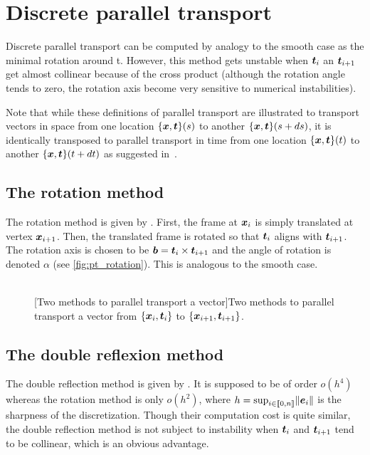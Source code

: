 \section{Discrete parallel transport}\label{sec:discrete_pt}

Discrete parallel transport can be computed by analogy to the smooth case as the minimal rotation around t. However, this method gets unstable when $\boldsymbol{t}_i$ an $\boldsymbol{t}_{i+1}$ get almost collinear because of the cross product (although the rotation angle tends to zero, the rotation axis become very sensitive to numerical instabilities).

Note that while these definitions of parallel transport are illustrated to transport vectors in space from one location $\{\boldsymbol{x},\boldsymbol{t}\}(s)$ to another $\{\boldsymbol{x},\boldsymbol{t}\}(s + ds)$, it is identically transposed to parallel transport in time from one location $\{\boldsymbol{x},\boldsymbol{t}\}(t)$ to another $\{\boldsymbol{x},\boldsymbol{t}\}(t+dt)$ as suggested in~\cite{Bergou2010}.

\subsection{The rotation method}

The rotation method is given by . First, the frame at $\boldsymbol{x}_i$ is simply translated at vertex $\boldsymbol{x}_{i+1}$. Then, the translated frame is rotated so that $\boldsymbol{t}_i$ aligns with $\boldsymbol{t}_{i+1}$. The rotation axis is chosen to be $\boldsymbol{b} = \boldsymbol{t}_i \times \boldsymbol{t}_{i+1}$ and the angle of rotation is denoted $\alpha$ (see \cref{fig:pt_rotation}). This is analogous to the smooth case.

\begin{figure}[!p]
	\captionsetup[subfloat]{captionskip=10pt}
	\centering
	\\
	\vspace{10pt}
	[Two methods to parallel transport a vector]{Two methods to parallel transport a vector from $\{\boldsymbol{x}_i,\boldsymbol{t}_i\}$ to $\{\boldsymbol{x}_{i+1},\boldsymbol{t}_{i+1}\}$.}
	\label{fig:pt}
\end{figure}

\subsection{The double reflexion method}
The double reflection method is given by . It is supposed to be of order $o(h^4)$ whereas the rotation method is only $o(h^2)$, where $h = \sup_{i\in \llbracket 0,n \rrbracket} \lVert\boldsymbol{e}_i\rVert$ is the sharpness of the discretization. Though their computation cost is quite similar, the double reflection method is not subject to instability when $\boldsymbol{t}_i$ and $\boldsymbol{t}_{i+1}$ tend to be collinear, which is an obvious advantage.

